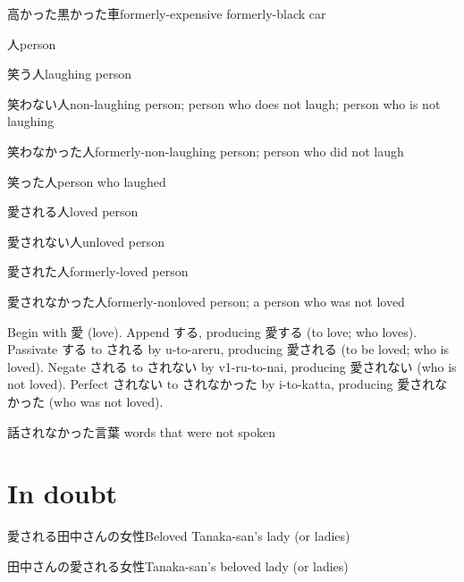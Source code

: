 高かった黒かった車formerly-expensive formerly-black car

人person

笑う人laughing person

笑わない人non-laughing person; person who does not laugh; person who is not laughing

笑わなかった人formerly-non-laughing person; person who did not laugh

笑った人person who laughed

愛される人loved person

愛されない人unloved person

愛された人formerly-loved person

愛されなかった人formerly-nonloved person; a person who was not loved

Begin with 愛 (love).
Append する, producing 愛する (to love; who loves).
Passivate する to される by u-to-areru, producing 愛される (to be loved; who is loved).
Negate される to されない by v1-ru-to-nai, producing 愛されない (who is not loved).
Perfect されない to されなかった by i-to-katta, producing 愛されなかった (who was not loved).

話されなかった言葉
words that were not spoken

\section{In doubt}

愛される田中さんの女性Beloved Tanaka-san's lady (or ladies)

田中さんの愛される女性Tanaka-san's beloved lady (or ladies)

